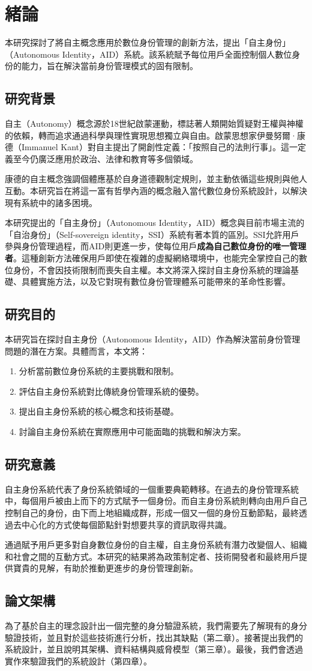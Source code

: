 
\chapter{緒論}
本研究探討了將自主概念應用於數位身份管理的創新方法，提出「自主身份」（Autonomous Identity，AID）系統。該系統賦予每位用戶全面控制個人數位身份的能力，旨在解決當前身份管理模式的固有限制。
\section{研究背景}
自主（Autonomy）概念源於18世紀啟蒙運動，標誌著人類開始質疑對王權與神權的依賴，轉而追求通過科學與理性實現思想獨立與自由。啟蒙思想家伊曼努爾·康德（Immanuel Kant）對自主提出了開創性定義：「按照自己的法則行事」。這一定義至今仍廣泛應用於政治、法律和教育等多個領域。

康德的自主概念強調個體應基於自身道德觀制定規則，並主動依循這些規則與他人互動。本研究旨在將這一富有哲學內涵的概念融入當代數位身份系統設計，以解決現有系統中的諸多困境。

本研究提出的「自主身份」（Autonomous Identity，AID）概念與目前市場主流的「自治身份」（Self-sovereign identity，SSI）系統有著本質的區別。SSI允許用戶參與身份管理過程，而AID則更進一步，使每位用戶\textbf{成為自己數位身份的唯一管理者}。這種創新方法確保用戶即使在複雜的虛擬網絡環境中，也能完全掌控自己的數位身份，不會因技術限制而喪失自主權。本文將深入探討自主身份系統的理論基礎、具體實施方法，以及它對現有數位身份管理體系可能帶來的革命性影響。
\section{研究目的}
本研究旨在探討自主身份（Autonomous Identity，AID）作為解決當前身份管理問題的潛在方案。具體而言，本文將：
\begin{enumerate}
  \item 分析當前數位身份系統的主要挑戰和限制。
  \item 評估自主身份系統對比傳統身份管理系統的優勢。
  \item 提出自主身份系統的核心概念和技術基礎。
  \item 討論自主身份系統在實際應用中可能面臨的挑戰和解決方案。
\end{enumerate}
\section{研究意義}
自主身份系統代表了身份系統領域的一個重要典範轉移。在過去的身份管理系統中，每個用戶被由上而下的方式賦予一個身份。而自主身份系統則轉向由用戶自己控制自己的身份，由下而上地組織成群，形成一個又一個的身份互動節點，最終透過去中心化的方式使每個節點針對想要共享的資訊取得共識。

通過賦予用戶更多對自身數位身份的自主權，自主身份系統有潛力改變個人、組織和社會之間的互動方式。本研究的結果將為政策制定者、技術開發者和最終用戶提供寶貴的見解，有助於推動更進步的身份管理創新。
\section{論文架構}
為了基於自主的理念設計出一個完整的身分驗證系統，我們需要先了解現有的身分驗證技術，並且對於這些技術進行分析，找出其缺點（第二章）。接著提出我們的系統設計，並且說明其架構、資料結構與威脅模型（第三章）。最後，我們會透過實作來驗證我們的系統設計（第四章）。